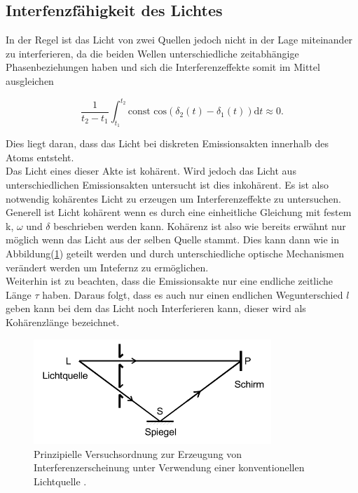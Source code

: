     \subsection{Interfenzfähigkeit des Lichtes}

        \noindent In der Regel ist das Licht von zwei Quellen jedoch nicht in der Lage miteinander zu interferieren, da die beiden Wellen 
        unterschiedliche zeitabhängige Phasenbeziehungen haben und sich die Interferenzeffekte somit im Mittel ausgleichen

        \begin{equation}
            \frac{1}{t_2 - t_1} \int_{t_1}^{t_2} \text{const cos}(\delta_2(t)-\delta_1(t)) \text{d}t \approx 0 . \nonumber
        \end{equation}
        
        \noindent Dies liegt daran, dass das Licht bei diskreten Emissionsakten innerhalb des Atoms entsteht.\\
        Das Licht eines dieser Akte ist kohärent. Wird jedoch das Licht aus unterschiedlichen Emissionsakten untersucht ist dies inkohärent.
        Es ist also notwendig kohärentes Licht zu erzeugen um Interferenzeffekte zu untersuchen. Generell ist Licht kohärent wenn es durch 
        eine einheitliche Gleichung mit festem k, $\omega$ und $\delta$ beschrieben werden kann. Kohärenz ist also wie bereits erwähnt nur möglich wenn 
        das Licht aus der selben Quelle stammt. Dies kann dann wie in Abbildung(\ref{img:konv}) geteilt werden und durch unterschiedliche optische 
        Mechanismen verändert werden um Intefernz zu ermöglichen.\\ Weiterhin ist zu beachten, dass die Emissionsakte nur eine endliche 
        zeitliche Länge $\tau$ haben. Daraus folgt, dass es auch nur einen endlichen Wegunterschied $l$ geben kann bei dem das Licht noch 
        Interferieren kann, dieser wird als Kohärenzlänge bezeichnet.
        
        \begin{figure}[ht]
            \centering
            \includegraphics[width=0.8\textwidth]{latex/images/konvenL.PNG}
            \caption{Prinzipielle Versuchsordnung zur Erzeugung von Interferenzerscheinung unter Verwendung einer konventionellen 
            Lichtquelle \protect \cite{V401}.}
            \label{img:konv}
        \end{figure}

